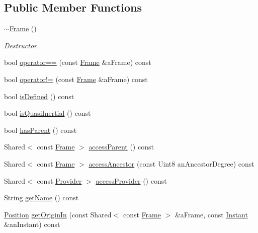 \subsection*{Public Member Functions}
\begin{DoxyCompactItemize}
\item 
\hyperlink{classlibrary_1_1physics_1_1coord_1_1_frame_a7a4b031eff12e290c0ccacb7d5a47dfd}{$\sim$\+Frame} ()
\begin{DoxyCompactList}\small\item\em Destructor. \end{DoxyCompactList}\item 
bool \hyperlink{classlibrary_1_1physics_1_1coord_1_1_frame_a19c5c4ce3b1669a774980d9c3f18fe6c}{operator==} (const \hyperlink{classlibrary_1_1physics_1_1coord_1_1_frame}{Frame} \&a\+Frame) const
\item 
bool \hyperlink{classlibrary_1_1physics_1_1coord_1_1_frame_a2b3b046c3779b4281f14601302446169}{operator!=} (const \hyperlink{classlibrary_1_1physics_1_1coord_1_1_frame}{Frame} \&a\+Frame) const
\item 
bool \hyperlink{classlibrary_1_1physics_1_1coord_1_1_frame_ad5a450dd6740fc5a27473e661375dde6}{is\+Defined} () const
\item 
bool \hyperlink{classlibrary_1_1physics_1_1coord_1_1_frame_a894d1ac6152e28dbb749058ca6ffd663}{is\+Quasi\+Inertial} () const
\item 
bool \hyperlink{classlibrary_1_1physics_1_1coord_1_1_frame_afd83dec4bf4e2aabc2b31019b282965e}{has\+Parent} () const
\item 
Shared$<$ const \hyperlink{classlibrary_1_1physics_1_1coord_1_1_frame}{Frame} $>$ \hyperlink{classlibrary_1_1physics_1_1coord_1_1_frame_a30d789571e08b1fbcddbdde656a95a79}{access\+Parent} () const
\item 
Shared$<$ const \hyperlink{classlibrary_1_1physics_1_1coord_1_1_frame}{Frame} $>$ \hyperlink{classlibrary_1_1physics_1_1coord_1_1_frame_abcadc7427a971aa37a66123cb9b8322b}{access\+Ancestor} (const Uint8 an\+Ancestor\+Degree) const
\item 
Shared$<$ const \hyperlink{classlibrary_1_1physics_1_1coord_1_1frame_1_1_provider}{Provider} $>$ \hyperlink{classlibrary_1_1physics_1_1coord_1_1_frame_a5da9096ace352a91d272677cc159c059}{access\+Provider} () const
\item 
String \hyperlink{classlibrary_1_1physics_1_1coord_1_1_frame_afec582db83d2bf93b2b070f8557ee760}{get\+Name} () const
\item 
\hyperlink{classlibrary_1_1physics_1_1coord_1_1_position}{Position} \hyperlink{classlibrary_1_1physics_1_1coord_1_1_frame_aa68223b40939d6dd45ace7746805d33c}{get\+Origin\+In} (const Shared$<$ const \hyperlink{classlibrary_1_1physics_1_1coord_1_1_frame}{Frame} $>$ \&a\+Frame, const \hyperlink{classlibrary_1_1physics_1_1time_1_1_instant}{Instant} \&an\+Instant) const

\end{DoxyCompactItemize}
